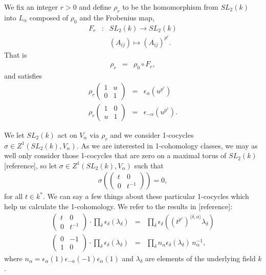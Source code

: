 We fix an integer $r > 0$ and define $\rho_r$ to be the homomorphism from $SL_2(k)$ into $L_\alpha$ composed of $\rho_0$ and the Frobenius map,
\begin{eqnarray*}
F_r&:&SL_2(k)\rightarrow SL_2(k) \\
&& (A_{ij}) \mapsto (A_{ij})^{p^r}.
\end{eqnarray*}
That is
\begin{eqnarray*}
\rho_r &=& \rho_0 \circ F_r,
\end{eqnarray*}
and satisfies
\begin{eqnarray*}
\rho_r \left(\begin{matrix} 1 &  u \\ 0 & 1 \end{matrix} \right) &=& \epsilon_\alpha(u^{p^r}) \\
\rho_r \left(\begin{matrix} 1 & 0 \\ u & 1 \end{matrix} \right) &=& \epsilon_{-\alpha}(u^{p^r}).
\end{eqnarray*}

We let $SL_2(k)$ act on $V_\alpha$ via $\rho_r$ and we consider 1-cocycles $\sigma \in Z^1(SL_2(k), V_\alpha)$. As we are interested in 1-cohomology classes, we may as well only consider those 1-cocycles that are zero on a maximal torus of $SL_2(k)$ [reference], so let $\sigma \in Z^1(SL_2(k), V_\alpha)$ such that
\begin{eqnarray*}
\sigma\left(\left(\begin{matrix} t & 0 \\ 0 & t^{-1}\end{matrix}\right)\right) = 0,
\end{eqnarray*}
for all $t\in k^*$.
We can say a few things about these particular 1-cocycles which help us calculate the 1-cohomology. We refer to the results in [reference]:
\begin{eqnarray*}
\left(\begin{matrix} t & 0 \\ 0 & t^{-1}\end{matrix}\right) \cdot \prod_\delta \epsilon_\delta (\lambda_\delta) &=&
\prod_\delta \epsilon_\delta\left( (t^{p^r})^{\langle \delta, \alpha\rangle}\lambda_\delta\right) \\
\left(\begin{matrix} 0 & -1 \\ 1 & 0 \end{matrix}\right) \cdot \prod_\delta \epsilon_\delta (\lambda_\delta) &=&
\prod_\delta n_\alpha \epsilon_\delta\left( \lambda_\delta\right)\, n_\alpha^{-1},
\end{eqnarray*}
where $n_\alpha = \epsilon_\alpha(1)\epsilon_{-\alpha}(-1)\epsilon_\alpha(1)$ and $\lambda_\delta$ are elements of the underlying field $k$.

